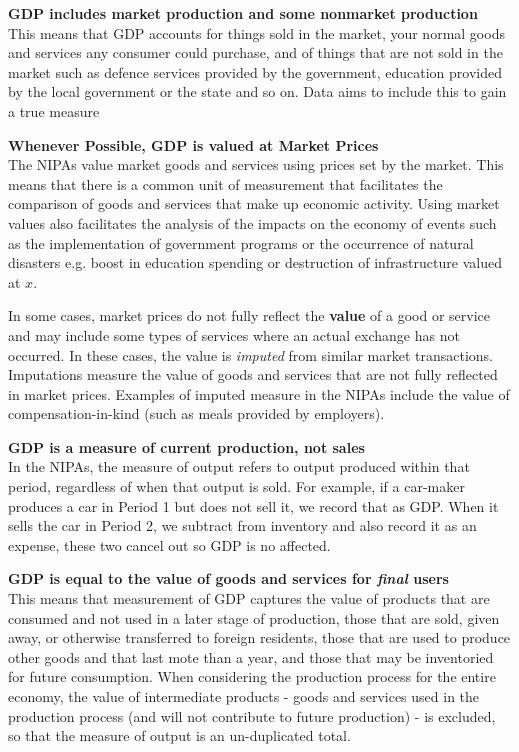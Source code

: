 \documentclass[12pt, letterpaper]{article}
\begin{document}
{\vspace{10pt}
\noindent\textbf{GDP includes market production and some nonmarket production}\\
This means that GDP accounts for things sold in the market, your normal goods and services any consumer could purchase, and of things that are not sold in the market such as defence services provided by the government, education provided by the local government or the state and so on. Data aims to include this to gain a true measure

\vspace{10pt}
\noindent\textbf{Whenever Possible, GDP is valued at Market Prices}\\
The NIPAs value market goods and services using prices set by the market. This means that there is a common unit of measurement that facilitates the comparison of goods and services that make up economic activity. Using market values also facilitates the analysis of the impacts on the economy of events such as the implementation of government programs or the occurrence of natural disasters e.g. boost in education spending or destruction of infrastructure valued at $x$.

In some cases, market prices do not fully reflect the \textbf{value} of a good or service and may include some types of services where an actual exchange has not occurred. In these cases, the value is \textit{imputed} from similar market transactions. Imputations measure the value of goods and services that are not fully reflected in market prices. Examples of imputed measure in the NIPAs include the value of compensation-in-kind (such as meals provided by employers).

\vspace{10pt}
\noindent\textbf{GDP is a measure of current production, not sales}\\
In the NIPAs, the measure of output refers to output produced within that period, regardless of when that output is sold. For example, if a car-maker produces a car in Period 1 but does not sell it, we record that as GDP. When it sells the car in Period 2, we subtract from inventory and also record it as an expense, these two cancel out so GDP is no affected.

\vspace{10pt}
\noindent\textbf{GDP is equal to the value of goods and services for \textit{final} users}\\
This means that measurement of GDP captures the value of products that are consumed and not used in a later stage of production, those that are sold, given away, or otherwise transferred to foreign residents, those that are used to produce other goods and that last mote than a year, and those that may be inventoried for future consumption. When considering the production process for the entire economy, the value of intermediate products - goods and services used in the production process (and will not contribute to future production) - is excluded, so that the measure of output is an un-duplicated total. 

}
\end{document}
